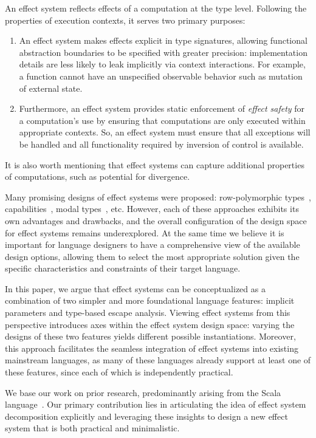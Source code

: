 \documentclass[acmsmall,review,screen]{acmart}
\begin{document}
An effect system reflects effects of a computation at the type level.
Following the properties of execution contexts, it serves two primary purposes:
\begin{enumerate}
    \item An effect system makes effects explicit in type signatures, allowing functional abstraction boundaries to be specified with greater precision: implementation details are less likely to leak implicitly via context interactions.
    For example, a function cannot have an unspecified observable behavior such as mutation of external state.
    \item Furthermore, an effect system provides static enforcement of \textit{effect safety} for a computation’s use by ensuring that computations are only executed within appropriate contexts.
    So, an effect system must ensure that all exceptions will be handled and all functionality required by inversion of control is available.
\end{enumerate}
It is also worth mentioning that effect systems can capture additional properties of computations, such as potential for divergence.

Many promising designs of effect systems were proposed: row-polymorphic types~\cite{leijen2014koka}, capabilities~\cite{brachthauser2022effects, boruch2023capturing}, modal types~\cite{tang2025modal}, etc.
However, each of these approaches exhibits its own advantages and drawbacks, and the overall configuration of the design space for effect systems remains underexplored.
At the same time we believe it is important for language designers to have a comprehensive view of the available design options, allowing them to select the most appropriate solution given the specific characteristics and constraints of their target language.

In this paper, we argue that effect systems can be conceptualized as a combination of two simpler and more foundational language features: implicit parameters and type-based escape analysis.
Viewing effect systems from this perspective introduces axes within the effect system design space: varying the designs of these two features yields different possible instantiations.
Moreover, this approach facilitates the seamless integration of effect systems into existing mainstream languages, as many of these languages already support at least one of these features, since each of which is independently practical.

We base our work on prior research, predominantly arising from the Scala language~\cite{odersky2021safer, boruch2023capturing}.
Our primary contribution lies in articulating the idea of effect system decomposition explicitly and leveraging these insights to design a new effect system that is both practical and minimalistic.
\end{document}
